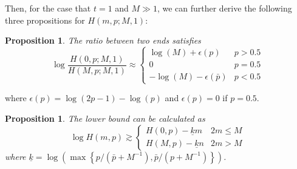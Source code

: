 \documentclass{article}
\newtheorem{proposition}[theorem]{Proposition}
\begin{document}
Then, for the case that $t=1$ and $M\gg 1$, we can further derive the following three propositions for $H(m,p;M,1)$:
\begin{proposition}
\label{Ratio1}
The ratio between two ends satisfies
$$\log\frac{H(0,p;M,1)}{H(M,p;M,1)} \approx \left\{
    \begin{array}{cl}
    \log(M)+\epsilon(p) & p>0.5\\
    0 & p=0.5\\
    -\log(M)-\epsilon(\bar{p}) & p<0.5
    \end{array}\right.$$
\end{proposition}
where $\epsilon(p)=\log(2p-1)-\log(p)$ and $\epsilon(p)=0$ if $p=0.5$.
\begin{proposition}
\label{LowBound1}
The lower bound can be calculated as
\begin{equation*}
\log H(m,p)\gtrsim \left\{
    \begin{array}{cl}
    H(0,p)- \underline{k}m& 2m\leq M\\
    H(M,p)- \underline{k}n& 2m>M
    \end{array}\right.
\end{equation*}
where $\underline{k}=\log\left(\max\left\{p/(\bar{p}+M^{-1}),\bar{p}/(p+M^{-1})\right\}\right)$.
\end{proposition}
\end{document}
